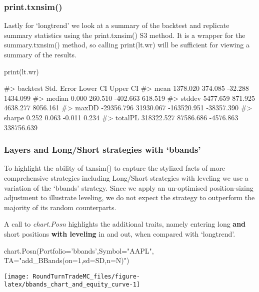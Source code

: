 \hypertarget{print.txnsim}{%
\subsubsection{print.txnsim()}\label{print.txnsim}}

Lastly for `longtrend' we look at a summary of the backtest and
replicate summary statistics using the print.txnsim() S3 method. It is a
wrapper for the summary.txnsim() method, so calling print(lt.wr) will be
sufficient for viewing a summary of the results.

\begin{Schunk}
\begin{Sinput}
print(lt.wr)
\end{Sinput}
\begin{Soutput}
#>           backtest Std. Error    Lower CI   Upper CI
#> mean      1378.020    374.085     -32.288   1434.099
#> median       0.000    260.510    -402.663    618.519
#> stddev    5477.659    871.925    4638.277   8056.161
#> maxDD   -29356.796  31930.067 -163520.951 -38357.390
#> sharpe       0.252      0.063      -0.011      0.234
#> totalPL 318322.527  87586.686   -4576.863 338756.639
\end{Soutput}
\end{Schunk}

\hypertarget{layers-and-longshort-strategies-with-bbands}{%
\subsubsection{Layers and Long/Short strategies with
`bbands'}\label{layers-and-longshort-strategies-with-bbands}}

To highlight the ability of txnsim() to capture the stylized facts of
more comprehensive strategies including Long/Short strategies with
leveling we use a variation of the `bbands' strategy. Since we apply an
un-optimised position-sizing adjustment to illustrate leveling, we do
not expect the strategy to outperform the majority of its random
counterparts.

A call to \emph{chart.Posn} highlights the additional traits, namely
entering long \textbf{and} short positions \textbf{with leveling} in and
out, when compared with `longtrend'.

\begin{Schunk}
\begin{Sinput}
chart.Posn(Portfolio='bbands',Symbol="AAPL",
           TA="add_BBands(on=1,sd=SD,n=N)")
\end{Sinput}


\begin{center}\texttt{[image: RoundTurnTradeMC\_files/figure-latex/bbands\_chart\_and\_equity\_curve-1]} \end{center}

\end{Schunk}

